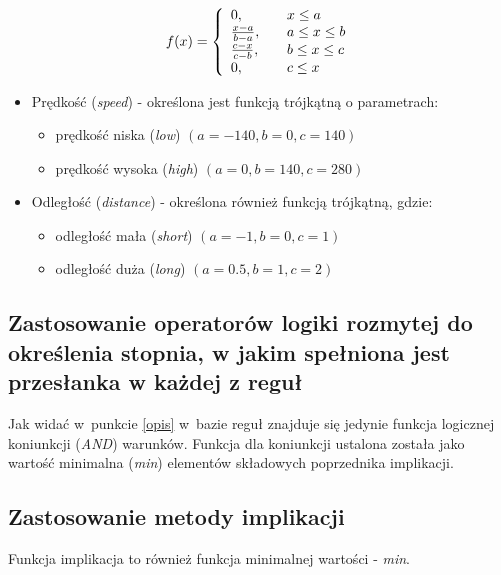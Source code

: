 \documentclass[11pt,a4paper]{article}
\begin{document}
\begin{equation}
f(x)=\left\{ 
  \begin{array}{l l}
    0, & \quad x\leq a\\
    \frac{x-a}{b-a}, &\quad a\leq x \leq b \\
    \frac{c-x}{c-b}, &\quad b\leq x \leq c \\
    0, &\quad c\leq x\\
  \end{array} \right.
  \label{trojkat}
  \end{equation}

\begin{itemize}
\item Prędkość (\emph{speed}) - określona jest funkcją trójkątną o parametrach:
\begin{itemize}
\item prędkość niska (\emph{low}) $(a=-140, b=0, c=140)$
\item prędkość wysoka (\emph{high}) $(a=0, b=140, c=280)$
\end{itemize}

\item Odległość (\emph{distance}) - określona również funkcją trójkątną, gdzie:
\begin{itemize}
\item odległość mała (\emph{short}) $(a=-1, b=0, c=1)$
\item odległość duża (\emph{long}) $(a=0.5, b=1, c=2)$
\end{itemize}

\end{itemize}

\subsection{Zastosowanie operatorów logiki rozmytej do określenia stopnia, w jakim spełniona jest  
przesłanka w każdej z reguł}
Jak widać w~punkcie \ref{opis} w~bazie reguł znajduje się jedynie funkcja logicznej koniunkcji (\emph{AND}) warunków. Funkcja dla koniunkcji ustalona została jako wartość minimalna (\emph{min}) elementów składowych poprzednika implikacji.

\subsection{Zastosowanie metody implikacji}
Funkcja implikacja to również funkcja minimalnej wartości - \emph{min}.
\end{document}
